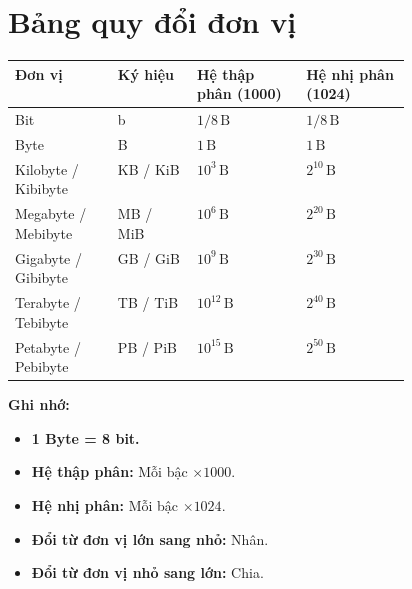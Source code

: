 \chapter*{Bảng quy đổi đơn vị}
\begingroup
    \small
    \setlength{\tabcolsep}{5pt}
    \renewcommand{\arraystretch}{1.8}

    \noindent
    \begin{tabularx}{\linewidth}{@{}
        >{\raggedright\arraybackslash}p{0.26\linewidth}
        >{\raggedright\arraybackslash}p{0.20\linewidth}
        >{\raggedright\arraybackslash}X
        >{\raggedright\arraybackslash}X@{}}
        \textbf{Đơn vị} & \textbf{Ký hiệu}
            & \textbf{Hệ thập phân (1000)} & \textbf{Hệ nhị phân (1024)} \\
        \hline
        Bit & b & $1/8\,\mathrm{B}$ & $1/8\,\mathrm{B}$ \\
        \hline
        Byte & B & $1\,\mathrm{B}$ & $1\,\mathrm{B}$ \\
        \hline
        Kilobyte / Kibibyte & KB / KiB & $10^{3}\,\mathrm{B}$ & $2^{10}\,\mathrm{B}$ \\
        \hline
        Megabyte / Mebibyte & MB / MiB & $10^{6}\,\mathrm{B}$ & $2^{20}\,\mathrm{B}$ \\
        \hline
        Gigabyte / Gibibyte & GB / GiB & $10^{9}\,\mathrm{B}$ & $2^{30}\,\mathrm{B}$ \\
        \hline
        Terabyte / Tebibyte & TB / TiB & $10^{12}\,\mathrm{B}$ & $2^{40}\,\mathrm{B}$ \\
        \hline
        Petabyte / Pebibyte & PB / PiB & $10^{15}\,\mathrm{B}$ & $2^{50}\,\mathrm{B}$ \\
    \end{tabularx}
    \par
\endgroup

\medskip
\noindent\textbf{Ghi nhớ:}
\begin{itemize}
    \item \textbf{1 Byte = 8 bit.}
    \item \textbf{Hệ thập phân:} Mỗi bậc $\times 1000$.
    \item \textbf{Hệ nhị phân:} Mỗi bậc $\times 1024$.
    \item \textbf{Đổi từ đơn vị lớn sang nhỏ:} Nhân.
    \item \textbf{Đổi từ đơn vị nhỏ sang lớn:} Chia.
\end{itemize}
